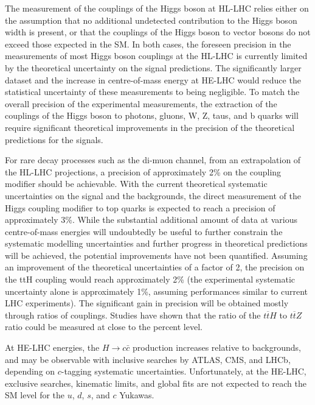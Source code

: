 \documentclass[../report.tex]{subfiles}
\begin{document}
The measurement of the couplings of the Higgs boson at HL-LHC relies either on the assumption that no additional undetected contribution to the Higgs boson width is present, or that the couplings of the Higgs boson to vector bosons do not exceed those expected in the SM. In both cases, the foreseen precision in the measurements of most Higgs boson couplings at the HL-LHC is currently limited by the theoretical uncertainty on the signal predictions. The significantly larger dataset and the increase in centre-of-mass energy at HE-LHC would reduce the statistical uncertainty of these measurements to being negligible.
To match the overall precision of the experimental measurements, the extraction of the couplings of the Higgs boson to photons, gluons, W, Z, taus, and b quarks will require significant theoretical improvements in the precision of the theoretical predictions for the signals.

For rare decay processes such as the di-muon channel, from an extrapolation of the HL-LHC projections, a precision of approximately 2\% on the coupling modifier 
should be achievable.
 With the current theoretical systematic uncertainties on the signal and the backgrounds, the direct measurement of the Higgs coupling modifier to top quarks is expected to reach a precision of approximately 3\%. While the substantial additional amount of data at various centre-of-mass energies will undoubtedly be useful to further constrain the systematic modelling uncertainties and further progress in theoretical predictions will be achieved, the potential improvements have not been quantified. Assuming an improvement of the theoretical uncertainties of a factor of 2, the precision on the ttH coupling would reach approximately 2\% (the experimental systematic uncertainty alone is approximately 1\%, assuming performances similar to current LHC experiments). The significant gain in precision will be obtained mostly through ratios of couplings. Studies have shown that the ratio of the $t\overline{t}H$ to $t\overline{t}Z$ ratio could be measured at close to the percent level.

At HE-LHC energies, the $H \to c\bar{c}$ production increases relative to backgrounds, and may be observable with inclusive searches by ATLAS, CMS, and LHCb, depending on $c$-tagging systematic uncertainties. Unfortunately, at the HE-LHC, exclusive searches, kinematic limits, and global fits are not expected to reach the SM level for the $u$, $d$, $s$, and $c$ Yukawas.
\end{document}
